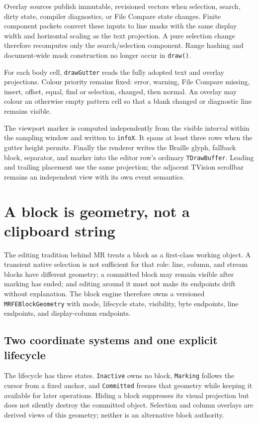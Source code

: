 \documentclass[a4paper,10pt,twoside,openany]{book}
\newcommand{\mr}{\textsc{MR}}
\begin{document}
Overlay sources publish immutable, revisioned vectors when selection, search,
dirty state, compiler diagnostics, or File Compare state changes. Finite
component packets convert these inputs to line masks with the same display
width and horizontal scaling as the text projection. A pure selection change
therefore recomputes only the search/selection component. Range hashing and
document-wide mask construction no longer occur in \texttt{draw()}.

For each body cell, \texttt{drawGutter} reads the fully adopted text and overlay
projections. Colour priority remains fixed: error, warning, File Compare
missing, insert, offset, equal, find or selection, changed, then normal. An
overlay may colour an otherwise empty pattern cell so that a blank changed or
diagnostic line remains visible.

The viewport marker is computed independently from the visible interval within
the sampling window and written to \texttt{infoX}. It spans at least three rows
when the gutter height permits. Finally the renderer writes the Braille glyph,
fallback block, separator, and marker into the editor row's ordinary
\texttt{TDrawBuffer}. Leading and trailing placement use the same projection;
the adjacent TVision scrollbar remains an independent view with its own event
semantics.

\chapter{A block is geometry, not a clipboard string}
\label{ch:block-engine}

The editing tradition behind \mr{} treats a block as a first-class working
object. A transient native selection is not sufficient for that role: line,
column, and stream blocks have different geometry; a committed block may
remain visible after marking has ended; and editing around it must not make
its endpoints drift without explanation. The block engine therefore owns a
versioned \texttt{MRFEBlockGeometry} with mode, lifecycle state, visibility,
byte endpoints, line endpoints, and display-column endpoints.

\section{Two coordinate systems and one explicit lifecycle}

The lifecycle has three states. \texttt{Inactive} owns no block,
\texttt{Marking} follows the cursor from a fixed anchor, and
\texttt{Committed} freezes that geometry while keeping it available for later
operations. Hiding a block suppresses its visual projection but does not
silently destroy the committed object. Selection and column overlays are
derived views of this geometry; neither is an alternative block authority.
\end{document}
